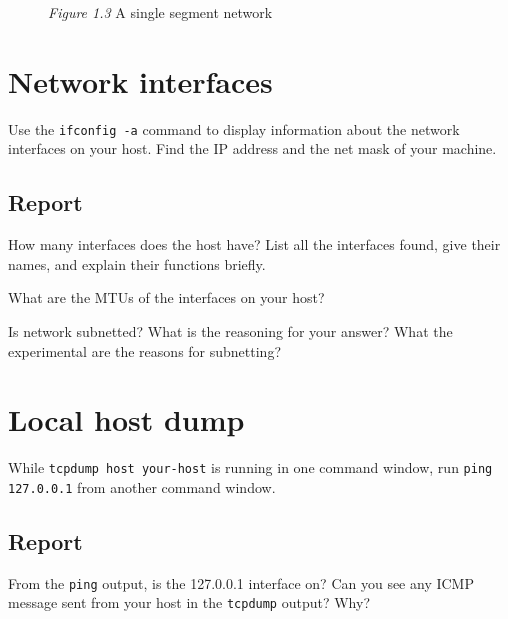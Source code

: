 \documentclass{../UTNetLab}
\begin{document}
\begin{center}
\begin{minipage}{0.48\textwidth}
\begin{flushright}
\begin{figure}[H]
                    \caption{\textit{Figure 1.3} A single segment network}        
                \end{figure}
            \end{flushright}
        \end{minipage}
    \end{center}

\section{Network interfaces}
    Use the \lstinline{ifconfig -a} command to display information about the network interfaces on your host.
    Find the IP address and the net mask of your machine.
    \subsection*{Report}

    How many interfaces does the host have?
    List all the interfaces found, give their names, and explain their functions briefly.

    What are the MTUs of the interfaces on your host?

    Is network subnetted?
    What is the reasoning for your answer? What the experimental are the reasons for subnetting?


\section{Local host dump}
    While \lstinline[emph={your-host}]{tcpdump host your-host} is running in one command window, run \lstinline{ping 127.0.0.1} from another command window.
    
    \subsection*{Report}
    From the \lstinline{ping} output, is the 127.0.0.1 interface on?
    Can you see any ICMP message sent from your host in the \lstinline{tcpdump} output?
    Why?
\end{document}
